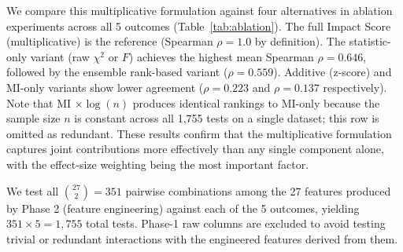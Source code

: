 \documentclass[conference]{IEEEtran}
\begin{document}
We compare this multiplicative formulation against four alternatives in ablation experiments across all 5 outcomes (Table~\ref{tab:ablation}). The full Impact Score (multiplicative) is the reference (Spearman $\rho = 1.0$ by definition). The statistic-only variant (raw $\chi^2$ or $F$) achieves the highest mean Spearman $\rho = 0.646$, followed by the ensemble rank-based variant ($\rho = 0.559$). Additive (z-score) and MI-only variants show lower agreement ($\rho = 0.223$ and $\rho = 0.137$ respectively). Note that MI $\times \log(n)$ produces identical rankings to MI-only because the sample size $n$ is constant across all 1,755 tests on a single dataset; this row is omitted as redundant. These results confirm that the multiplicative formulation captures joint contributions more effectively than any single component alone, with the effect-size weighting being the most important factor.

\begin{table}[htb]
\centering
\small
\renewcommand{\arraystretch}{1.15}
\caption{Component ablation: Spearman correlation of alternative formulations vs. full Impact Score across all 5 outcomes. Higher values indicate closer agreement with the proposed metric.}
\label{tab:ablation}
\end{table}

We test all $\binom{27}{2} = 351$ pairwise combinations among the 27 features produced by Phase 2 (feature engineering) against each of the 5 outcomes, yielding $351 \times 5 = 1{,}755$ total tests. Phase-1 raw columns are excluded to avoid testing trivial or redundant interactions with the engineered features derived from them.
\end{document}
